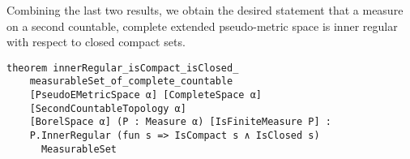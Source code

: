 \documentclass[lean]{DraftAFM}
\begin{document}
Combining the last two results, we obtain the desired statement that a measure on a second countable,
complete extended pseudo-metric space is inner regular with respect to
closed compact sets.

\begin{verbatim}
theorem innerRegular_isCompact_isClosed_
    measurableSet_of_complete_countable
    [PseudoEMetricSpace α] [CompleteSpace α]
    [SecondCountableTopology α]
    [BorelSpace α] (P : Measure α) [IsFiniteMeasure P] :
    P.InnerRegular (fun s => IsCompact s ∧ IsClosed s)
      MeasurableSet
\end{verbatim}



\end{document}
